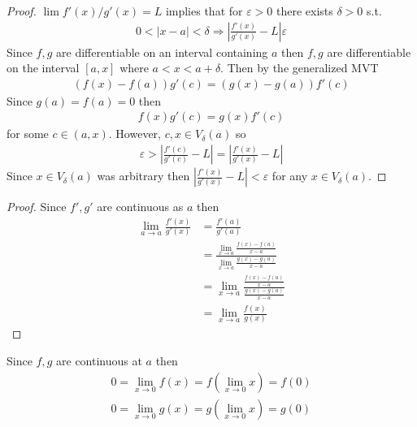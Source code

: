 \begin{proof}
    $\lim f'(x)/g'(x)=L$ implies that for $\varepsilon>0$ 
    there exists $\delta>0$ s.t. 
    \begin{align*}
        0<|x-a|<\delta \Rightarrow |\frac{f'(x)}{g'(x)}-L|\varepsilon
    \end{align*}
    Since $f,g$ are differentiable on an interval containing $a$ then 
    $f,g$ are differentiable on the interval $[a,x]$ where $a<x<a+\delta$.
    Then by the generalized MVT 
    \begin{align*}
        (f(x)-f(a))g'(c) = (g(x)-g(a))f'(c)
    \end{align*}
    Since $g(a)=f(a)=0$ then 
    \begin{align*}
        f(x)g'(c) = g(x)f'(c)
    \end{align*}
    for some $c\in (a,x)$.
    However, $c,x\in V_\delta(a)$ so 
    \begin{align*}
        \varepsilon>|\frac{f'(c)}{g'(c)}-L|=|\frac{f'(x)}{g'(x)}-L|
    \end{align*}
    Since $x\in V_\delta(a)$ was arbitrary then $|\frac{f'(x)}{g'(x)}-L|<\varepsilon$
    for any $x\in V_\delta(a)$.
\end{proof}

\begin{proof}
    Since $f',g'$ are continuous as $a$ then 
    \begin{align*}
        \lim_{a\rightarrow a}\frac{f'(x)}{g'(x)} &= \frac{f'(a)}{g'(a)} \\
        &= \frac{\lim_{x\rightarrow a}\frac{f(x)-f(a)}{x-a}}{\lim_{x\rightarrow a}\frac{g(x)-g(a)}{x-a}} \\
        &= \lim_{x\rightarrow a} \frac{\frac{f(x)-f(a)}{x-a}}{\frac{g(x)-g(a)}{x-a}} \\  
        &= \lim_{x\rightarrow a} \frac{f(x)}{g(x)}    
    \end{align*}
\end{proof}

Since $f,g$ are continuous at $a$ then 
\begin{gather*}
    0=\lim_{x\rightarrow 0} f(x)=  f(\lim_{x\rightarrow 0} x) = f(0) \\
    0=\lim_{x\rightarrow 0} g(x)=  g(\lim_{x\rightarrow 0} x) = g(0)
\end{gather*}